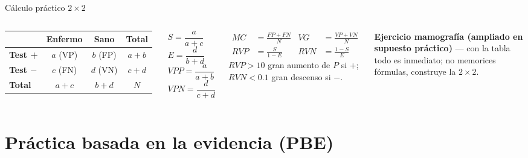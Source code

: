 \documentclass[aspectratio=169,8pt]{beamer}
\begin{document}
\begin{frame}{C\'alculo pr\'actico $2\times2$}
  \small
  \begin{columns}[T,onlytextwidth]
      \centering
      \begin{tabular}{lccc}
        \toprule
        & \textbf{Enfermo} & \textbf{Sano} & \textbf{Total}\\
        \midrule
        \textbf{Test +} & $a$ (VP) & $b$ (FP) & $a+b$\\
        \textbf{Test $-$} & $c$ (FN) & $d$ (VN) & $c+d$\\
        \midrule
        \textbf{Total} & $a+c$ & $b+d$ & $N$\\
        \bottomrule
      \end{tabular}
      \vspace{0.5em}

      \begin{tcolorbox}[tealbox]
        \footnotesize
        $S=\dfrac{a}{a+c}$ \quad $E=\dfrac{d}{b+d}$\\[2pt]
        $VPP=\dfrac{a}{a+b}$ \quad $VPN=\dfrac{d}{c+d}$
      \end{tcolorbox}
      \begin{tcolorbox}[formulabox,title=Otros \'indices]
        \small
        \begin{align*}
          MC &= \frac{FP+FN}{N} & VG &= \frac{VP+VN}{N}\\[2pt]
          RVP &= \frac{S}{1-E} & RVN &= \frac{1-S}{E}
        \end{align*}
        \vspace{-0.6em}
        {\scriptsize $RVP>10$ gran aumento de $P$ si +;\quad $RVN<0.1$ gran descenso si $-$.}
      \end{tcolorbox}
      \begin{tcolorbox}[amberbox]
        \scriptsize\textbf{Ejercicio mamograf\'ia (ampliado en supuesto pr\'actico)} --- con la tabla todo es inmediato; no memorices f\'ormulas, construye la $2\times2$.
      \end{tcolorbox}
    \end{columns}
\end{frame}

\section{Pr\'actica basada en la evidencia (PBE)}
\end{document}
